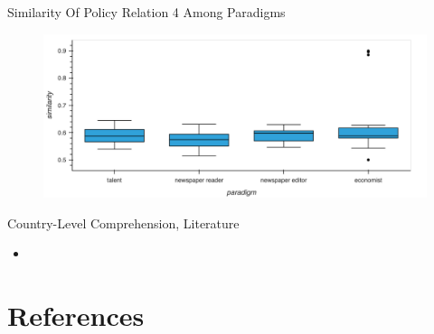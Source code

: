 \documentclass[12pt]{beamer}
\begin{document}
\begin{frame}{Similarity Of Policy Relation 4 Among Paradigms}
\begin{figure}[H]
\centering
\includegraphics[width=11.5cm]{Figures/fig34.png}
\end{figure}
\end{frame}


\begin{frame}{Country-Level Comprehension, Literature}
\begin{itemize}
    \item \cite{Lin2023a}
\end{itemize}
\end{frame}


\section{References}


\begin{frame}[allowframebreaks]{}
\renewcommand{\section}[2]{}%

\end{frame}
\end{document}
